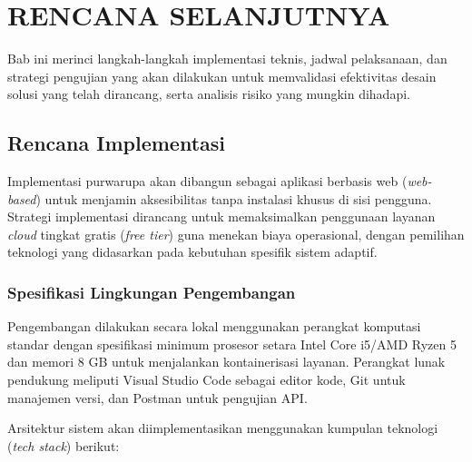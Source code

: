 \chapter{RENCANA SELANJUTNYA}
\label{chap:rencana-selanjutnya}

Bab ini merinci langkah-langkah implementasi teknis, jadwal pelaksanaan, dan strategi pengujian yang akan dilakukan untuk memvalidasi efektivitas desain solusi yang telah dirancang, serta analisis risiko yang mungkin dihadapi.

\section{Rencana Implementasi}
\label{sec:rencana_implementasi}
Implementasi purwarupa akan dibangun sebagai aplikasi berbasis web (\textit{web-based}) untuk menjamin aksesibilitas tanpa instalasi khusus di sisi pengguna. Strategi implementasi dirancang untuk memaksimalkan penggunaan layanan \textit{cloud} tingkat gratis (\textit{free tier}) guna menekan biaya operasional, dengan pemilihan teknologi yang didasarkan pada kebutuhan spesifik sistem adaptif.

\subsection{Spesifikasi Lingkungan Pengembangan}
Pengembangan dilakukan secara lokal menggunakan perangkat komputasi standar dengan spesifikasi minimum prosesor setara Intel Core i5/AMD Ryzen 5 dan memori 8 GB untuk menjalankan kontainerisasi layanan. Perangkat lunak pendukung meliputi Visual Studio Code sebagai editor kode, Git untuk manajemen versi, dan Postman untuk pengujian API.

Arsitektur sistem akan diimplementasikan menggunakan kumpulan teknologi (\textit{tech stack}) berikut:

